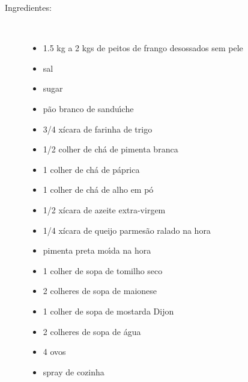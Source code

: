 \documentclass [11pt, papel de carta] {article}
\begin{document}
\begin {description}

\item [Ingredientes:] \ \\
\begin {itemize}
\item 1.5 kg  a 2 kgs de peitos de frango desossados sem pele
\item sal
\item sugar
\item p\~ao branco de sandu\'{\i}che
\item 3/4 xícara de farinha de trigo
\item 1/2 colher de chá de pimenta branca
\item 1 colher de chá de páprica
\item 1 colher de chá de alho em pó
\item 1/2 xícara de azeite extra-virgem
\item 1/4 xícara de queijo parmesão ralado na hora
\item pimenta preta mo\'{\i}da na hora
\item 1 colher de sopa de tomilho seco
\item 2 colheres de sopa de maionese
\item 1 colher de sopa de mostarda Dijon
\item 2 colheres de sopa de água
\item 4 ovos
\item spray de cozinha
\end {itemize}


\end{description}
\end{document}
